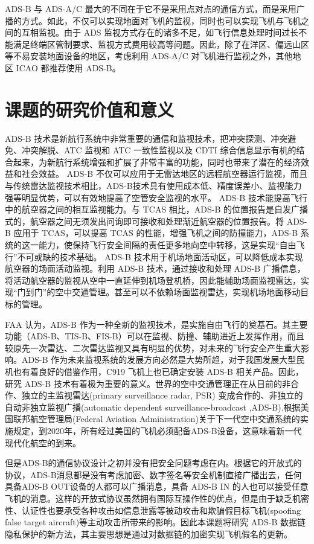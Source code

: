ADS-B 与 ADS-A/C 最大的不同在于它不是采用点对点的通信方式，而是采用广播的方式。如此，不仅可以实现地面对飞机的监视，同时也可以实现飞机与飞机之间的互相监视。由于 ADS 监视方式存在的诸多不足，如飞行信息处理时间过长不能满足终端区管制要求、监视方式费用较高等问题。因此，除了在洋区、偏远山区等不易安装地面设备的地区，考虑利用 ADS-A/C 对飞机进行监视之外，其他地区 ICAO 都推荐使用 ADS-B\cite{dai2011guang}。
\section{课题的研究价值和意义}
ADS-B 技术是新航行系统中非常重要的通信和监视技术，把冲突探测、冲突避免、冲突解脱、ATC 监视和 ATC 一致性监视以及 CDTI 综合信息显示有机的结合起来，为新航行系统增强和扩展了非常丰富的功能，同时也带来了潜在的经济效益和社会效益。 ADS-B 不仅可以应用于无雷达地区的远程航空器运行监视，而且与传统雷达监视技术相比，ADS-B技术具有使用成本低、精度误差小、监视能力强等明显优势，可以有效地提高了空管安全监视的水平。 ADS-B 技术能提高飞行中的航空器之间的相互监视能力。与 TCAS 相比，ADS-B 的位置报告是自发广播式的，航空器之间无须发出问询即可接收和处理渐近航空器的位置报告。将 ADS-B 应用于 TCAS，可以提高 TCAS 的性能，增强飞机之间的防撞能力，ADS-B 系统的这一能力，使保持飞行安全间隔的责任更多地向空中转移，这是实现“自由飞行”不可或缺的技术基础。 ADS-B 技术用于机场地面活动区，可以降低成本实现航空器的场面活动监视。利用 ADS-B 技术，通过接收和处理 ADS-B 广播信息，将活动航空器的监视从空中一直延伸到机场登机桥，因此能辅助场面监视雷达，实现“门到门”的空中交通管理。甚至可以不依赖场面监视雷达，实现机场地面移动目标的管理\cite{huang2008guang}。 

FAA 认为，ADS-B 作为一种全新的监视技术，是实施自由飞行的奠基石。其主要功能（ADS-B、TIS-B、FIS-B）可以在监视、防撞、辅助进近上发挥作用，而且较原先一次雷达、二次雷达监视又具有明显的优势，对未来的飞行安全产生重大影响。ADS-B 作为未来监视系统的发展方向必然是大势所趋，对于我国发展大型民机也有着良好的借鉴作用，C919 飞机上也已确定安装 ADS-B 相关产品。因此，研究 ADS-B 技术有着极为重要的意义。世界的空中交通管理正在从目前的非合作、独立的主监视雷达(primary surveillance radar, PSR) 变成合作的、非独立的 自动非独立监视广播(automatic dependent surveillance-broadcast ,ADS-B).根据美国联邦航空管理局(Federal Aviation Administration)关于下一代空中交通系统的实施规定，到2020年，所有经过美国的飞机必须配备ADS-B设备\cite{mccallie2011security}，这意味着新一代现代化航空的到来。

但是ADS-B的通信协议设计之初并没有把安全问题考虑在内。根据它的开放式的协议，ADS-B消息都是没有考虑加密、数字签名等安全机制直接广播出去，任何具备ADS-B OUT设备的人都可以广播消息，具备 ADS-B IN 的人也可以接受任意飞机的消息。这样的开放式协议虽然拥有国际互操作性的优点，但是由于缺乏机密性、认证性也要承受各种攻击如信息泄露等被动攻击和欺骗假目标飞机(spoofing false target aircraft)等主动攻击所带来的影响。因此本课题将研究 ADS-B 数据链隐私保护的新方法，其主要思想是通过对数据链的加密实现飞机假名的更新。
